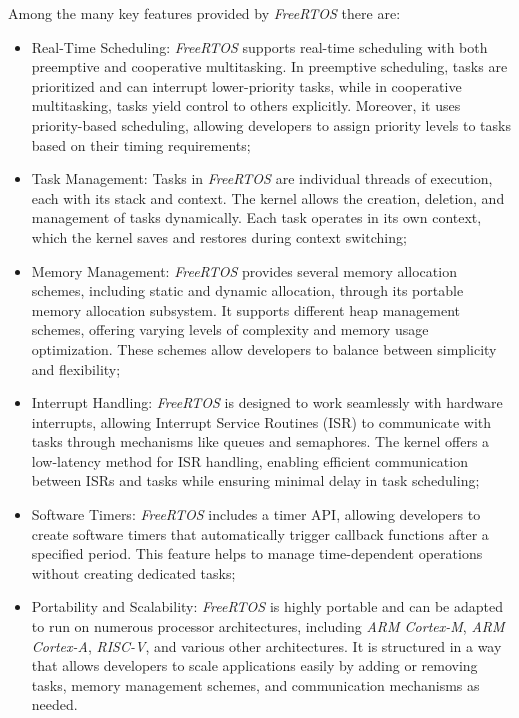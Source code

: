 Among the many key features provided by \textit{FreeRTOS} there are:
\begin{itemize}
  \item Real-Time Scheduling: \textit{FreeRTOS} supports real-time scheduling with
    both preemptive and cooperative multitasking. In preemptive scheduling, tasks
    are prioritized and can interrupt lower-priority tasks, while in cooperative
    multitasking, tasks yield control to others explicitly. Moreover, it uses priority-based
    scheduling, allowing developers to assign priority levels to tasks based on
    their timing requirements;

  \item Task Management: Tasks in \textit{FreeRTOS} are individual threads of execution,
    each with its stack and context. The kernel allows the creation, deletion, and
    management of tasks dynamically. Each task operates in its own context, which
    the kernel saves and restores during context switching;

  \item Memory Management: \textit{FreeRTOS} provides several memory allocation schemes,
    including static and dynamic allocation, through its portable memory allocation
    subsystem. It supports different heap management schemes, offering varying levels
    of complexity and memory usage optimization. These schemes allow developers
    to balance between simplicity and flexibility;

  \item Interrupt Handling: \textit{FreeRTOS} is designed to work seamlessly with
    hardware interrupts, allowing Interrupt Service Routines (ISR) to
    communicate with tasks through mechanisms like queues and semaphores. The kernel
    offers a low-latency method for ISR handling, enabling efficient
    communication between ISRs and tasks while ensuring minimal delay in task
    scheduling;

  \item Software Timers: \textit{FreeRTOS} includes a timer API, allowing
    developers to create software timers that automatically trigger callback
    functions after a specified period. This feature helps to manage time-dependent
    operations without creating dedicated tasks;

  \item Portability and Scalability: \textit{FreeRTOS} is highly portable and can
    be adapted to run on numerous processor architectures, including \textit{ARM
    Cortex-M}, \textit{ARM Cortex-A}, \textit{RISC-V}, and various other
    architectures. It is structured in a way that allows developers to scale applications
    easily by adding or removing tasks, memory management schemes, and communication
    mechanisms as needed.
\end{itemize}

